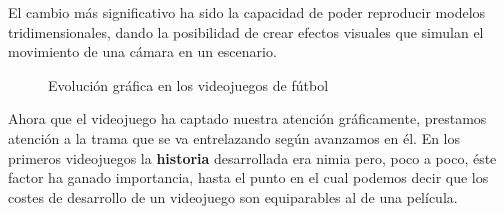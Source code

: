  El cambio más significativo ha sido la capacidad de poder reproducir modelos tridimensionales, dando la posibilidad de crear efectos visuales que simulan el movimiento de una cámara en un escenario.
\newline 

\begin{figure}[h]
	\centerfloat	 
	\newline
	\caption{Evolución gráfica en los videojuegos de fútbol}
\end{figure}

Ahora que el videojuego ha captado nuestra atención gráficamente, prestamos atención a la trama que se va entrelazando según avanzamos en él. En los primeros videojuegos la \textbf{historia} desarrollada era nimia pero, poco a poco, éste factor ha ganado importancia, hasta el punto en el cual podemos decir que los costes de desarrollo de un videojuego son equiparables al de una película.
\newline

